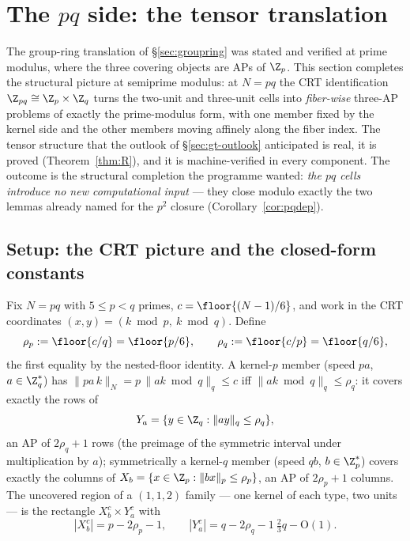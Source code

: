
\section{The $pq$ side: the tensor translation}\label{sec:pq}

The group-ring translation of \S\ref{sec:groupring} was stated and verified at
prime modulus, where the three covering objects are APs of $\Z_p$. This
section completes the structural picture at semiprime modulus: at $N=pq$ the
CRT identification $\Z_{pq}\cong\Z_p\times\Z_q$ turns the two-unit and
three-unit cells into \emph{fiber-wise} three-AP problems of exactly the
prime-modulus form, with one member fixed by the kernel side and the other
members moving affinely along the fiber index. The tensor structure that the
outlook of \S\ref{sec:gt-outlook} anticipated is real, it is proved
(Theorem~\ref{thm:R}), and it is machine-verified in every component. The
outcome is the structural completion the programme wanted: \emph{the $pq$
cells introduce no new computational input} --- they close modulo exactly the
two lemmas already named for the $p^2$ closure (Corollary~\ref{cor:pqdep}).

\subsection{Setup: the CRT picture and the closed-form constants}
\label{sec:pq-setup}

Fix $N=pq$ with $5\le p<q$ primes, $c=\floor{(N-1)/6}$, and work in the CRT
coordinates $(x,y)=(k\bmod p,\ k\bmod q)$. Define
\[
\rho_p:=\floor{c/q}=\floor{p/6},\qquad \rho_q:=\floor{c/p}=\floor{q/6},
\]
the first equality by the nested-floor identity. A kernel-$p$ member (speed
$pa$, $a\in\Z_q^{*}$) has $\|pa\,k\|_{N}=p\,\|ak\bmod q\|_q\le c$ iff
$\|ak\bmod q\|_q\le\rho_q$: it covers exactly the rows of
\[
Y_a=\{y\in\Z_q:\|ay\|_q\le\rho_q\},
\]
an AP of $2\rho_q+1$ rows (the preimage of the symmetric interval under
multiplication by $a$); symmetrically a kernel-$q$ member (speed $qb$,
$b\in\Z_p^{*}$) covers exactly the columns of
$X_b=\{x\in\Z_p:\|bx\|_p\le\rho_p\}$, an AP of $2\rho_p+1$ columns. The
uncovered region of a $(1,1,2)$ family --- one kernel of each type, two units
--- is the rectangle $X_b^{c}\times Y_a^{c}$ with
\[
|X_b^{c}|=p-2\rho_p-1,\qquad |Y_a^{c}|=q-2\rho_q-1\ \tfrac{2}{3}q-\mathrm{O}(1).
\]

